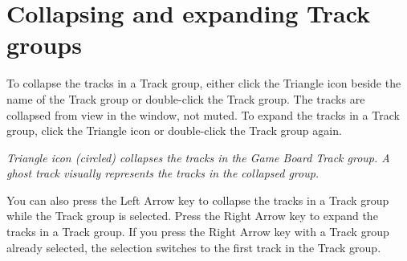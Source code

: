 \chapter{Collapsing and expanding Track groups}
\hypertarget{md__library_2_package_cache_2com_8unity_8timeline_0d1_87_86_2_documentation_0i_2grp__hide}{}\label{md__library_2_package_cache_2com_8unity_8timeline_0d1_87_86_2_documentation_0i_2grp__hide}
\label{md__library_2_package_cache_2com_8unity_8timeline_0d1_87_86_2_documentation_0i_2grp__hide_autotoc_md1142}%
%
 To collapse the tracks in a Track group, either click the Triangle icon beside the name of the Track group or double-\/click the Track group. The tracks are collapsed from view in the  window, not muted. To expand the tracks in a Track group, click the Triangle icon or double-\/click the Track group again.



{\itshape Triangle icon (circled) collapses the tracks in the Game Board Track group. A ghost track visually represents the tracks in the collapsed group.}

You can also press the Left Arrow key to collapse the tracks in a Track group while the Track group is selected. Press the Right Arrow key to expand the tracks in a Track group. If you press the Right Arrow key with a Track group already selected, the selection switches to the first track in the Track group. 